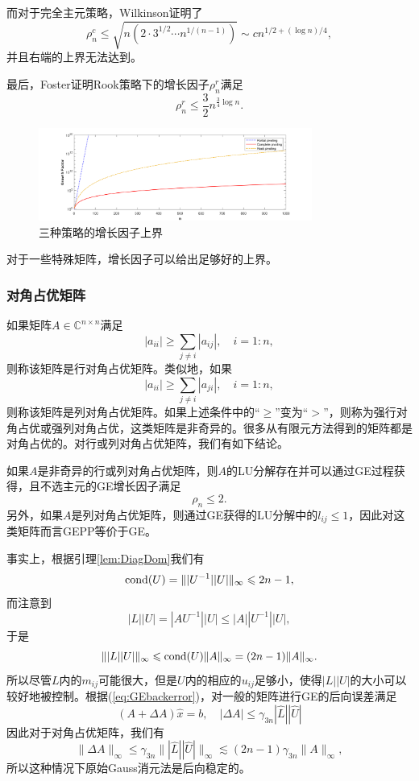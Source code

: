 \documentclass[a4paper,10pt]{ctexart}
\begin{document}
而对于完全主元策略，Wilkinson证明了
\begin{equation}
    \rho^c_n \leqslant \sqrt{n(2\cdot 3^{1 / 2}\cdots n^{1 / (n-1)})} \sim cn^{1/2 +(\log n) / 4},
\end{equation}
并且右端的上界无法达到。

最后，Foster证明Rook策略下的增长因子$ \rho^r_n $满足
\begin{equation}
    \rho^r_n \leqslant \frac{3}{2}n^{\frac{3}{4}\log n}.
\end{equation}
\begin{figure}[htpb]
    \centering
    \includegraphics[width=0.8\textwidth]{GrowthFactor.png}
    \caption{三种策略的增长因子上界}\label{fig:GrowthFactor}
\end{figure}

对于一些特殊矩阵，增长因子可以给出足够好的上界。
\subsubsection{对角占优矩阵}
如果矩阵$ A\in \mathbb{C}^{n\times n} $满足
\[
    |a_{ii}| \geqslant \sum_{j\neq i} |a_{ij}|,\quad i=1:n,
\]
则称该矩阵是行对角占优矩阵。类似地，如果
\[
    |a_{ii}| \geqslant \sum_{j\neq i} |a_{ji}|,\quad i=1:n,
\]
则称该矩阵是列对角占优矩阵。如果上述条件中的“$ \geqslant $”变为“$ > $”，则称为强行对角占优或强列对角占优，这类矩阵是非奇异的。很多从有限元方法得到的矩阵都是对角占优的。对行或列对角占优矩阵，我们有如下结论。
\begin{theorem}
    如果$ A $是非奇异的行或列对角占优矩阵，则$ A $的LU分解存在并可以通过GE过程获得，且不选主元的GE增长因子满足
    \begin{equation}
        \rho_n \leqslant 2.
    \end{equation}
    另外，如果$ A $是列对角占优矩阵，则通过GE获得的LU分解中的$ l_{ij}\leqslant 1 $，因此对这类矩阵而言GEPP等价于GE。
\end{theorem}
事实上，根据引理\ref{lem:DiagDom}我们有
\[
    {\rm cond}(U) = \| |U^{-1}| |U| \|_\infty \leqslant 2n-1,
\]
而注意到
\[
    |L| |U| = |A U^{-1}| |U| \leqslant |A| |U^{-1}| |U|,
\]
于是
\[
    \| |L| |U| \|_\infty \leqslant {\rm cond}(U)\| A \|_\infty = (2n-1)\| A \|_\infty.
\]
所以尽管$ L $内的$ m_{ij} $可能很大，但是$ U $内的相应的$ u_{ij} $足够小，使得$ |L| |U| $的大小可以较好地被控制。根据(\ref{eq:GEbackerror})，对一般的矩阵进行GE的后向误差满足
\[
    (A + \Delta A) \hat{x} = b, \quad |\Delta A| \leqslant \gamma_{3n} |\hat{L}| |\hat{U}|
\]
因此对于对角占优矩阵，我们有
\[
    \| \Delta A \|_\infty \leqslant \gamma_{3n} \| |\hat{L}| |\hat{U}| \|_\infty\lesssim (2n-1)\gamma_{3n} \| A \|_\infty,
\]
所以这种情况下原始Gauss消元法是后向稳定的。
\end{document}
